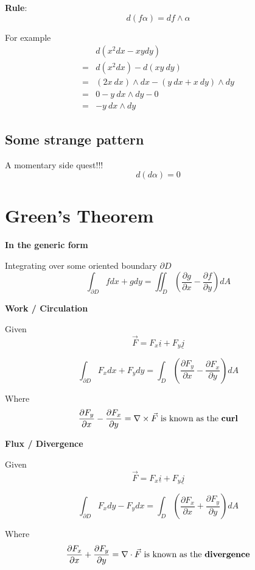 \begin{framed}
   \textbf{Rule}: 
   \[
     d(f \alpha) = df \wedge \alpha
   \] 
\end{framed}

For example
\begin{align*}
   &d(x^2 dx - xy dy) \\
   =& d(x^2 dx) - d(xy\ dy) \\
   =& (2x\ dx) \wedge dx - (y\ dx + x\ dy) \wedge dy \\
   =& 0 - y\ dx \wedge dy - 0 \\
   =& - y\ dx \wedge dy
\end{align*}

\subsection{Some strange pattern}

A momentary side quest!!!
\[
  d(d \alpha) = 0
\] 

\section{Green's Theorem}

\textbf{In the generic form}

Integrating over some oriented boundary $\partial D$
\[
   \int_{\partial D}^{} fdx + gdy  = \iint_{D} \left( \frac{\partial g}{\partial x} - \frac{\partial f}{\partial y} \right) dA
\] 

\textbf{Work / Circulation}

Given \[
  \vec{F} = F_x \underline{i} + F_y \underline{j}
\] 

\[
  \int_{\partial D}^{} F_x dx + F_y dy = \int_D \left( \frac{\partial F_y}{\partial x} - \frac{\partial F_x}{\partial y} \right)dA
\] 

Where 
\[
   \frac{\partial F_y}{\partial x} - \frac{\partial F_x}{\partial y} = \nabla \times \vec{F} \text{ is known as the \textbf{curl}}
\] 


\textbf{Flux / Divergence}

Given \[
  \vec{F} = F_x \underline{i} + F_y \underline{j}
\] 

\[
  \int_{\partial D}^{} F_x dy - F_y dx = \int_D \left( \frac{\partial F_x}{\partial x} + \frac{\partial F_y}{\partial y} \right)dA
\] 

Where 
\[
   \frac{\partial F_x}{\partial x} + \frac{\partial F_y}{\partial y} = \nabla \cdot \vec{F} \text{ is known as the \textbf{divergence}}
\] 

